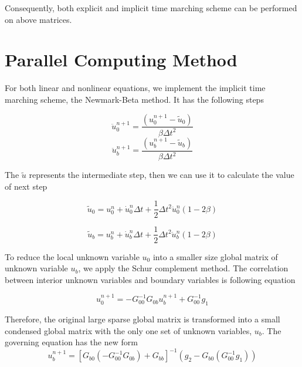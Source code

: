 Consequently, both explicit and implicit time marching scheme can be performed on above matrices.

\section{Parallel Computing Method}

For both linear and nonlinear equations, we implement the implicit time marching scheme, the Newmark-Beta method. It has the following steps

\begin{equation}
\ddot{u}_{0}^{n+1} = \frac{(u_{0}^{n+1} - \tilde{u}_{0})}{\beta \Delta t^{2}}
\end{equation}
\begin{equation}
\ddot{u}_{b}^{n+1} = \frac{(u_{b}^{n+1} - \tilde{u}_{b})}{\beta \Delta t^{2}}
\end{equation}

The $ \tilde{u} $ represents the intermediate step, then we can use it to calculate the value of next step

\begin{equation}
\tilde{u}_{0} = u_{0}^{n} + \dot{u}_{0}^{n} \Delta t + \frac{1}{2} \Delta t^{2} \ddot{u}_{0}^{n} (1 - 2 \beta)
\end{equation}

\begin{equation}
\tilde{u}_{b} = u_{b}^{n} + \dot{u}_{b}^{n} \Delta t + \frac{1}{2} \Delta t^{2} \ddot{u}_{b}^{n} (1 - 2 \beta)
\end{equation}

To reduce the local unknown variable $ u_{0} $ into a smaller size global matrix of unknown variable $ u_{b} $, we apply the Schur complement method. The correlation between interior unknown variables and boundary variables is following equation

\begin{equation}
u_{0}^{n+1} = -G_{00}^{-1} G_{0b} u_{b}^{n+1} + G_{00}^{-1} g_{1}
\end{equation}

Therefore, the original large sparse global matrix is transformed into a small condensed global matrix with the only one set of unknown variables, $ u_{b} $. The governing equation has the new form
\begin{equation}
u_{b}^{n+1} = [G_{b0}(-G_{00}^{-1}G_{0b}) + G_{bb}]^{-1} (g_{2} - G_{b0} (G_{00}^{-1} g_{1}))
\end{equation}

